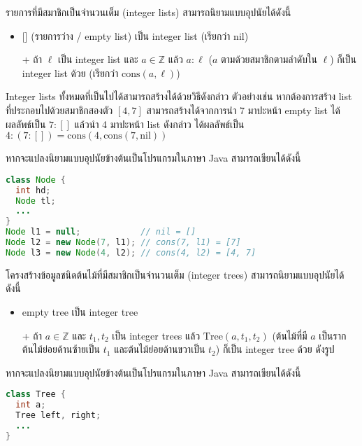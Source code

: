 \begin{example}
รายการที่มีสมาชิกเป็นจำนวนเต็ม (integer lists) สามารถนิยามแบบอุปนัยได้ดังนี้
\begin{itemize}
\item{} [] (รายการว่าง / empty list) เป็น integer list (เรียกว่า $\mathrm{nil}$)
\item[+] ถ้า $\ell$ เป็น integer list และ $a\in\mathbb{Z}$ แล้ว $a:\ell$ ($a$ ตามด้วยสมาชิกตามลำดับใน $\ell$) ก็เป็น integer list ด้วย (เรียกว่า $\mathrm{cons}(a,\ell)$)
\end{itemize}
Integer lists ทั้งหมดที่เป็นไปได้สามารถสร้างได้ด้วยวิธีดังกล่าว ตัวอย่างเช่น หากต้องการสร้าง list ที่ประกอบไปด้วยสมาชิกสองตัว $[4,7]$ สามารถสร้างได้จากการนำ 7 มาปะหน้า empty list ได้ผลลัพธ์เป็น $7:[]$ แล้วนำ 4 มาปะหน้า list ดังกล่าว ได้ผลลัพธ์เป็น $4:(7:[])=\mathrm{cons}(4, \mathrm{cons}(7, \mathrm{nil}))$

หากจะแปลงนิยามแบบอุปนัยข้างต้นเป็นโปรแกรมในภาษา Java สามารถเขียนได้ดังนี้
\begin{lstlisting}[language=Java]
class Node {
  int hd;
  Node tl;
  ...
}
Node l1 = null;            // nil = []
Node l2 = new Node(7, l1); // cons(7, l1) = [7]
Node l3 = new Node(4, l2); // cons(4, l2) = [4, 7]
\end{lstlisting}
\end{example}

\begin{example}
โครงสร้างข้อมูลชนิดต้นไม้ที่มีสมาชิกเป็นจำนวนเต็ม (integer trees) สามารถนิยามแบบอุปนัยได้ดังนี้
\begin{itemize}[]
\item empty tree เป็น integer tree
\item[+] ถ้า $a\in\mathbb{Z}$ และ $t_1,t_2$ เป็น integer trees แล้ว $\mathrm{Tree}(a, t_1, t_2)$ (ต้นไม้ที่มี $a$ เป็นราก ต้นไม้ย่อยด้านซ้ายเป็น $t_1$ และต้นไม้ย่อยด้านขวาเป็น $t_2$) ก็เป็น integer tree ด้วย ดังรูป
\begin{center}
\end{center}
\end{itemize}
หากจะแปลงนิยามแบบอุปนัยข้างต้นเป็นโปรแกรมในภาษา Java สามารถเขียนได้ดังนี้
\begin{lstlisting}[language=Java]
class Tree {
  int a;
  Tree left, right;
  ...
}
\end{lstlisting}
\end{example}

